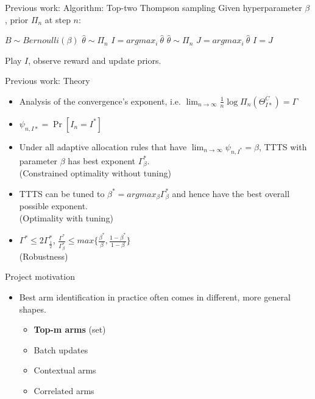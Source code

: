 \documentclass{beamer}
\begin{document}
\begin{frame}{Previous work: Algorithm: Top-two Thompson sampling}
Given hyperparameter $\beta$, prior $\Pi_n$ at step $n$:\\
\begin{algorithmic}
\State $B \sim Bernoulli(\beta)$
\State $\hat{\theta} \sim \Pi_n$
\State $I = argmax_i\ \hat{\theta}$
    \Repeat
        \State $\hat{\theta} \sim \Pi_n$
        \State $J = argmax_i\ \hat{\theta}$
    \State $I = J$
\EndIf
\end{algorithmic}
Play $I$, observe reward and update priors.
\end{frame}

\begin{frame}{Previous work: Theory}
    \begin{itemize}
        \item Analysis of the convergence's exponent, i.e. $\lim_{n\to\infty} \frac{1}{n} \log \Pi_n(\Theta_{I*}^C) = \Gamma$
        \item $\psi_{n, I*} = \Pr[I_n = I^*] $
        \item Under all adaptive allocation rules that have $\lim_{n\to\infty} \psi_{n, I^*} = \beta$, TTTS with parameter $\beta$ has best exponent $\Gamma_\beta^*$. \\(Constrained optimality without tuning)
        \item TTTS can be tuned to $\beta^* = argmax_\beta \Gamma_\beta^*$ and hence have the best overall possible exponent.\\ (Optimality with tuning)
        \item $\Gamma^* \leq 2 \Gamma_{\frac{1}{2}}^*$, $\frac{\Gamma^*}{\Gamma_\beta^*} \leq max\{\frac{\beta^*}{\beta}, \frac{1-\beta^*}{1 - \beta}\}$ \\(Robustness)
    \end{itemize}
\end{frame}


\begin{frame}{Project motivation}
    \begin{itemize}
        \item Best arm identification in practice often comes in different, more general shapes.
            \begin{itemize}
                \item \textbf{Top-m arms} (set)
                \item Batch updates
                \item Contextual arms
                \item Correlated arms
            \end{itemize}
    \end{itemize}
\end{frame}
\end{document}
